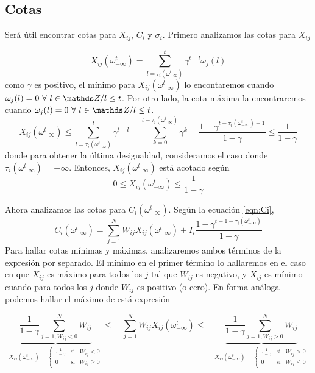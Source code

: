 \subsection{Cotas}
Será útil encontrar cotas para $X_{ij}$, $C_i$ y $\sigma_i$. Primero analizamos las cotas para $X_{ij}$

\begin{equation*}
    X_{ij}(\omega_{-\infty}^t) = \sum_{l=\tau_i(\omega_{-\infty}^t)}^t \gamma^{t-l} \omega_j(l)
\end{equation*}  
como $\gamma$ es positivo, el mínimo para $X_{ij}(\omega_{-\infty}^t)$ lo encontaremos cuando $\omega_j(l)=0 \ \forall \ l \in \enteros / l \leq t$. Por otro lado, la cota máxima la encontraremos cuando $\omega_j(l)=0 \ \forall \ l \in \enteros / l \leq t$.
\begin{equation*}
    X_{ij}(\omega_{-\infty}^t) \leq 
    \sum_{l=\tau_i(\omega_{-\infty}^t)}^t \gamma^{t-l} =
    \sum_{k=0}^{t-\tau_i(\omega_{-\infty}^t)} \gamma^{k} =
    \frac{1-\gamma^{t-\tau_i(\omega_{-\infty}^t)+1}}{1-\gamma} \leq
    \frac{1}{1-\gamma}
\end{equation*}  
donde para obtener la última desigualdad, consideramos el caso donde $\tau_i(\omega_{-\infty}^t) = -\infty$.
Entonces, $X_{ij}(\omega_{-\infty}^t)$ está acotado según
\begin{equation}
    0 \leq X_{ij}(\omega_{-\infty}^t) \leq 
    \frac{1}{1-\gamma}
    \label{eqn:cotaXij}
\end{equation}

Ahora analizamos las cotas para $C_i(\omega_{-\infty}^t)$. Según la ecuación \eqref{eqn:Ci}, 
\begin{equation}
     C_i(\omega_{-\infty}^t) = \sum_{j=1}^N W_{ij} X_{ij}(\omega_{-\infty}^t) + I_i \frac{1-\gamma^{t+1-\tau_i(\omega_{-\infty}^t) }}{1-\gamma}
     \label{eqn:Cib}
\end{equation}
Para hallar cotas mínimas y máximas, analizaremos ambos términos de la expresión por separado. El mínimo en el primer término lo hallaremos en el caso en que $X_{ij}$ es máximo para todos los $j$ tal que $W_{ij}$ es negativo, y $X_{ij}$ es mínimo cuando para todos los $j$ donde $W_{ij}$ es positivo (o cero). En forma análoga podemos hallar el máximo de está expresión

\begin{equation}
     \underbrace{\frac{1}{1-\gamma}\sum_{j=1, W_{ij}<0}^N W_{ij}}_{X_{ij}(\omega_{-\infty}^t) = \left\{ \begin{array}{ccc}
         \frac{1}{1-\gamma} & \text{si} & W_{ij} < 0 \\
         0 & \text{si} & W_{ij} \geq 0
     \end{array} \right.} \leq \quad \sum_{j=1}^N W_{ij} X_{ij}(\omega_{-\infty}^t) \leq \quad \underbrace{\frac{1}{1-\gamma}\sum_{j=1, W_{ij}>0}^N W_{ij}}_{X_{ij}(\omega_{-\infty}^t) = \left\{ \begin{array}{ccc}
         \frac{1}{1-\gamma} & \text{si} & W_{ij} > 0 \\
         0 & \text{si} & W_{ij} \leq 0
     \end{array} \right.}
     \label{eqn:cotasum}
\end{equation}

